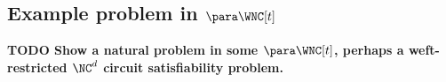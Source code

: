 \documentclass{article}
\newcommand{\todo}[1]{\textbf{TODO #1}}
\newcommand{\dash}{\textnormal{-}}
\newcommand{\cl}[1]{\left[{#1}\right]}
\begin{document}






\subsection{Example problem in \texorpdfstring{$\para \WNC[t]$}{paraWNC[t]}}

\todo{Show a natural problem in some $\para \WNC[t]$, perhaps a weft-restricted $\NC^d$ circuit satisfiability problem.}
\end{document}
